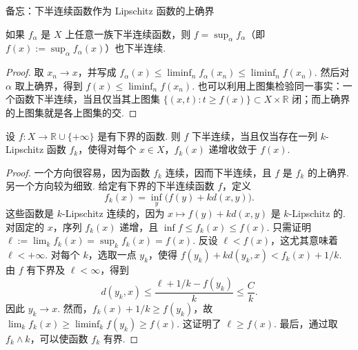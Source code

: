 \begin{sourcebox}{备忘：下半连续函数作为 Lipschitz 函数的上确界}\label{box:1.5}
\begin{theorem*}
如果 $f_\alpha$ 是 $X$ 上任意一族下半连续函数，则 $f=\sup_\alpha f_\alpha$（即 $f(x):=\sup_\alpha f_\alpha(x)$）也下半连续.
\end{theorem*}

\begin{proof}
取 $x_n\to x$，并写成 $f_\alpha(x)\le\liminf_n f_\alpha(x_n)\le\liminf_n f(x_n)$. 然后对 $\alpha$ 取上确界，得到 $f(x)\le\liminf_n f(x_n)$. 也可以利用上图集检验同一事实：一个函数下半连续，当且仅当其上图集 $\{(x,t):t\ge f(x)\}\subset X\times\mathbb R$ 闭；而上确界的上图集就是各上图集的交.
\end{proof}

\begin{theorem*}
设 $f:X\to\mathbb R\cup\{+\infty\}$ 是有下界的函数. 则 $f$ 下半连续，当且仅当存在一列 $k$-Lipschitz 函数 $f_k$，使得对每个 $x\in X$，$f_k(x)$ 递增收敛于 $f(x)$.
\end{theorem*}

\begin{proof}
一个方向很容易，因为函数 $f_k$ 连续，因而下半连续，且 $f$ 是 $f_k$ 的上确界. 另一个方向较为细致. 给定有下界的下半连续函数 $f$，定义
\[
f_k(x)=\inf_y\bigl(f(y)+k d(x,y)\bigr).
\]
这些函数是 $k$-Lipschitz 连续的，因为 $x\mapsto f(y)+k d(x,y)$ 是 $k$-Lipschitz 的. 对固定的 $x$，序列 $f_k(x)$ 递增，且 $\inf f\le f_k(x)\le f(x)$. 只需证明 $\ell:=\lim_k f_k(x)=\sup_k f_k(x)=f(x)$. 反设 $\ell<f(x)$，这尤其意味着 $\ell<+\infty$. 对每个 $k$，选取一点 $y_k$，使得 $f(y_k)+k d(y_k,x)<f_k(x)+1/k$. 由 $f$ 有下界及 $\ell<\infty$，得到
\[
d(y_k,x)\le\frac{\ell+1/k-f(y_k)}{k}\le\frac Ck.
\]
因此 $y_k\to x$. 然而，$f_k(x)+1/k\ge f(y_k)$，故 $\lim_k f_k(x)\ge\liminf_k f(y_k)\ge f(x)$. 这证明了 $\ell\ge f(x)$. 最后，通过取 $f_k\wedge k$，可以使函数 $f_k$ 有界.
\end{proof}
\end{sourcebox}

